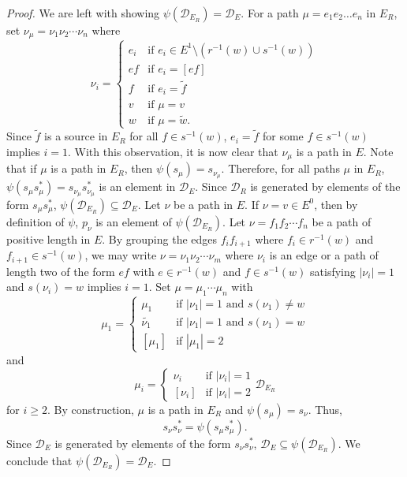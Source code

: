 \documentclass[12pt]{amsbook}%
\theoremstyle{defin}
\theoremstyle{remark}
\numberwithin{equation}{chapter}
\numberwithin{theor}{section}
\begin{document}
\begin{proof}
We are left with showing $\psi ( \mathcal{D}_{{E_R}}) = \mathcal{D}_E$.  For a path $\mu = e_1 e_2 \ldots e_n $ in $E_{R}$, set $\nu_\mu = \nu_1 \nu_2 \cdots \nu_n$ where 
\[
\nu_i = 
\begin{cases}
e_i &\text{if $e_i \in E^1 \setminus (  r^{-1} (w) \cup s^{-1} (w)  ) $} \\
ef &\text{if $e_i = [ef]$}\\
f &\text{if $e_i = \widetilde{f}$} \\
v &\text{if $\mu = v$} \\
w &\text{if $\mu = \widetilde{w}$.}
\end{cases}
\] 
Since $\widetilde{f}$ is a source in $E_{R}$ for all $f \in s^{-1} (w)$, $e_i = \widetilde{f}$ for some $f \in s^{-1}(w)$ implies $i = 1$.  With this observation, it is now clear that $\nu_\mu$ is a path in $E$.  Note that if $\mu$ is a path in $E_{R}$, then $\psi ( s_{\mu} ) = s_{ \nu_\mu}$.  Therefore, for all paths $\mu$ in $E_{R}$, $\psi ( s_\mu s_\mu^*) = s_{\nu_\mu} s_{\nu_\mu}^*$ is an element in $\mathcal{D}_E$.  Since $\mathcal{D}_{{R}}$ is generated by elements of the form $s_{\mu}s_\mu^*$, $\psi ( \mathcal{D}_{{E_R}} ) \subseteq \mathcal{D}_E$.  Let $\nu$ be a path in $E$.  If $\nu = v \in E^0$, then by definition of $\psi$, $p_\nu$ is an element of $\psi ( \mathcal{D}_{{E_R}} )$.  Let $\nu = f_1 f_2 \cdots f_n$ be a path of positive length in $E$.  By grouping the edges $f_i f_{i+1}$ where $f_i \in  r^{-1}(w)$ and $f_{i+1} \in s^{-1}(w)$, we may write $\nu = \nu_1 \nu_2 \cdots \nu_m$ where $\nu_i$ is an edge or a path of length two of the form $ef$ with $e \in r^{-1}(w)$ and $f \in s^{-1} (w)$ satisfying $| \nu_i | = 1$ and $s(\nu_i) = w$ implies $i = 1$.  Set $\mu = \mu_1 \cdots \mu_n$ with 
\[
\mu_1 = 
\begin{cases}
\mu_1 &\text{if $|\nu_1| = 1$ and $s( \nu_1) \neq w$} \\
\widetilde{\nu_1} &\text{if $| \nu_1| = 1$ and  $s( \nu_1) = w$} \\
[ \mu_1 ] &\text{if $|\mu_1| = 2$} 
\end{cases}
\]
and 
\[
\mu_i = 
\begin{cases}
\nu_i &\text{if $| \nu_i | = 1$} \\
[ \nu_i ] &\text{if $|\nu_i| = 2$}
\end{cases} \mathcal{D}_{{E_R}} 
\]
for $i \geq 2$.  By construction, $\mu$ is a path in $E_{R}$ and $\psi ( s_{\mu} ) = s_{\nu}$.  Thus, 
\[
s_\nu s_{\nu}^* = \psi ( s_\mu s_\mu^*).
\]
Since $\mathcal{D}_E$ is generated by elements of the form $s_\nu s_\nu^*$, $\mathcal{D}_E \subseteq \psi ( \mathcal{D}_{{E_R}} )$.  We conclude that $\psi ( \mathcal{D}_{{E_R}} ) = \mathcal{D}_E$.
\end{proof}
\end{document}
